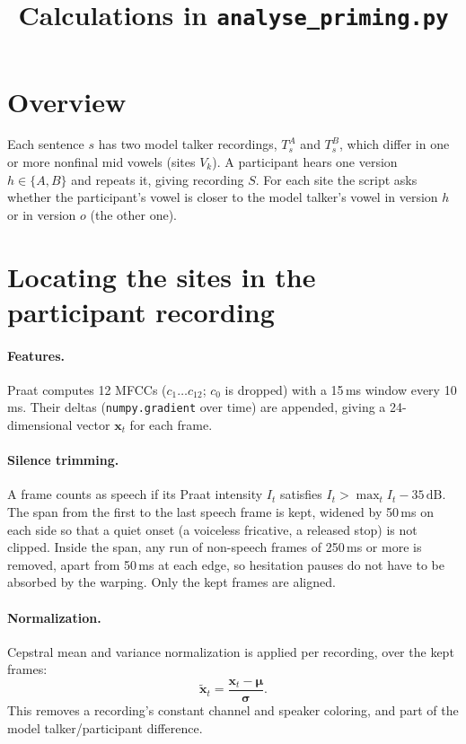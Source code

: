 \documentclass[11pt]{article}
\title{Calculations in \texttt{analyse\_priming.py}}
\date{}
\begin{document}
\maketitle

\section*{Overview}
Each sentence $s$ has two model talker recordings, $T^A_s$ and $T^B_s$, which differ in one or more nonfinal mid vowels (sites $V_k$). A participant hears one version $h \in \{A,B\}$ and repeats it, giving recording $S$. For each site the script asks whether the participant's vowel is closer to the model talker's vowel in version $h$ or in version $o$ (the other one).

\section{Locating the sites in the participant recording}

\paragraph{Features.} Praat computes 12 MFCCs ($c_1\ldots c_{12}$; $c_0$ is dropped) with a 15\,ms window every 10\,ms. Their deltas (\texttt{numpy.gradient} over time) are appended, giving a 24-dimensional vector $\mathbf{x}_t$ for each frame.

\paragraph{Silence trimming.} A frame counts as speech if its Praat intensity $I_t$ satisfies $I_t > \max_t I_t - 35\,\mathrm{dB}$. The span from the first to the last speech frame is kept, widened by 50\,ms on each side so that a quiet onset (a voiceless fricative, a released stop) is not clipped. Inside the span, any run of non-speech frames of 250\,ms or more is removed, apart from 50\,ms at each edge, so hesitation pauses do not have to be absorbed by the warping. Only the kept frames are aligned.

\paragraph{Normalization.} Cepstral mean and variance normalization is applied per recording, over the kept frames:
\[
\tilde{\mathbf{x}}_t = \frac{\mathbf{x}_t - \boldsymbol{\mu}}{\boldsymbol{\sigma}}.
\]
This removes a recording's constant channel and speaker coloring, and part of the model talker/participant difference.
\end{document}
